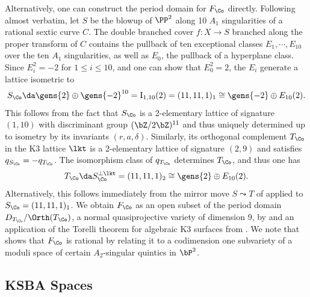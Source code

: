 \documentclass[../../main.tex]{subfiles}
\begin{document}
Alternatively, one can construct the period domain for $F_\Co$ directly. Following \cite[Prop. 3.1]{DK13} almost verbatim, let $S$ be the blowup of $\PP^2$ along 10 $A_1$ singularities of a rational sextic curve $C$. The double branched cover $f:X\to S$ branched along the proper transform of $C$ contains the pullback of ten exceptional classes $E_1,\cdots, E_{10}$ over the ten $A_1$ singularities, as well as $E_0$, the pullback of a hyperplane class. Since $E_i^2 = -2$ for $1\leq i \leq 10$, and one can show that $E_0^2 = 2$, the $E_i$ generate a lattice isometric to \[S_\Co \da \gens{2}\oplus \gens{-2}^{10} = \mathrm{I}_{1, 10}(2) = (11, 11, 1)_1 \cong \gens{-2} \oplus E_{10}(2).\] 
This follows from the fact that $S_{\Co}$ is a 2-elementary lattice of signature $(1, 10)$ with discriminant group $(\bZ/2\bZ)^{11}$ and thus uniquely determined up to isometry by its invariants $(r,a,\delta)$. Similarly, its orthogonal complement $T_{\Co}$ in the K3 lattice $\lkt$ is a 2-elementary lattice of signature $(2, 9)$ and satisfies $q_{S_{\Co}} = -q_{T_{\Co}}$. The isomorphism class of $q_{T_{\Co}}$ determines $T_\Co$, and thus one has
\[
T_\Co \da S_\Co^{\perp \lkt} = (11, 11, 1)_2 \cong \gens{2} \oplus E_{10}(2)
.\]
Alternatively, this follows immediately from the mirror move $S\leadsto T$ of \cite[Thm. 5.10]{AE22} applied to $S_\Co =(11, 11, 1)_1$.
We obtain $F_\Co$ as an open subset of the period domain $D_{T_\Co}/\Orth(T_\Co)$, a normal quasiprojective variety of dimension 9, by \cite[Prop. 3.2]{DK13} and an application of the Torelli theorem for algebraic K3 surfaces from \cite{PS71}. We note that \cite{DK13} shows that $F_\Co$ is rational by relating it to a codimension one subvariety of a moduli space of certain $A_2$-singular quintics in $\bP^2$.



\subsection{KSBA Spaces}
\end{document}
